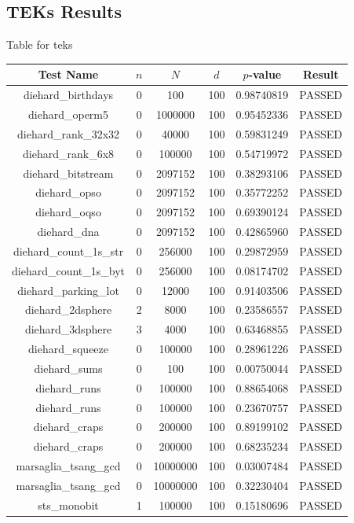 \subsection{TEKs Results}
Table for teks
\begin{longtable}{cccccc}
\toprule
Test Name & $n$ & $N$ & $d$ & $p$-value & Result \\
\midrule
diehard\_birthdays & 0 & 100 & 100 & 0.98740819 & PASSED \\
diehard\_operm5 & 0 & 1000000 & 100 & 0.95452336 & PASSED \\
diehard\_rank\_32x32 & 0 & 40000 & 100 & 0.59831249 & PASSED \\
diehard\_rank\_6x8 & 0 & 100000 & 100 & 0.54719972 & PASSED \\
diehard\_bitstream & 0 & 2097152 & 100 & 0.38293106 & PASSED \\
diehard\_opso & 0 & 2097152 & 100 & 0.35772252 & PASSED \\
diehard\_oqso & 0 & 2097152 & 100 & 0.69390124 & PASSED \\
diehard\_dna & 0 & 2097152 & 100 & 0.42865960 & PASSED \\
diehard\_count\_1s\_str & 0 & 256000 & 100 & 0.29872959 & PASSED \\
diehard\_count\_1s\_byt & 0 & 256000 & 100 & 0.08174702 & PASSED \\
diehard\_parking\_lot & 0 & 12000 & 100 & 0.91403506 & PASSED \\
diehard\_2dsphere & 2 & 8000 & 100 & 0.23586557 & PASSED \\
diehard\_3dsphere & 3 & 4000 & 100 & 0.63468855 & PASSED \\
diehard\_squeeze & 0 & 100000 & 100 & 0.28961226 & PASSED \\
diehard\_sums & 0 & 100 & 100 & 0.00750044 & PASSED \\
diehard\_runs & 0 & 100000 & 100 & 0.88654068 & PASSED \\
diehard\_runs & 0 & 100000 & 100 & 0.23670757 & PASSED \\
diehard\_craps & 0 & 200000 & 100 & 0.89199102 & PASSED \\
diehard\_craps & 0 & 200000 & 100 & 0.68235234 & PASSED \\
marsaglia\_tsang\_gcd & 0 & 10000000 & 100 & 0.03007484 & PASSED \\
marsaglia\_tsang\_gcd & 0 & 10000000 & 100 & 0.32230404 & PASSED \\
sts\_monobit & 1 & 100000 & 100 & 0.15180696 & PASSED \\

\end{longtable}
